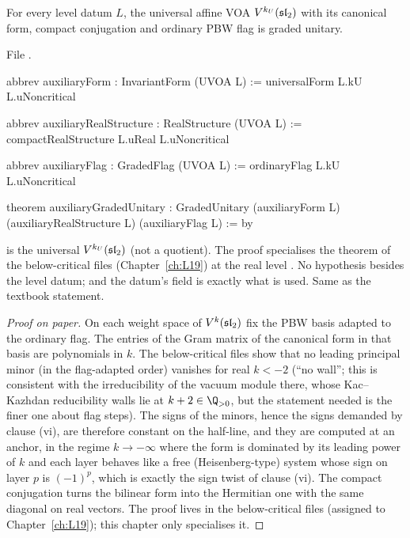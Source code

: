 \begin{theorem}\label{l29:thm:aux}
For every level datum $L$, the universal affine VOA $V^{k_U}(\mathfrak{sl}_2)$ with its canonical form, compact
conjugation and ordinary PBW flag is graded unitary.
\end{theorem}

\noindent File .
\begin{leancode}
abbrev auxiliaryForm : InvariantForm (UVOA L) := universalForm L.kU L.uNoncritical

abbrev auxiliaryRealStructure : RealStructure (UVOA L) :=
  compactRealStructure L.uReal L.uNoncritical

abbrev auxiliaryFlag : GradedFlag (UVOA L) := ordinaryFlag L.kU L.uNoncritical

theorem auxiliaryGradedUnitary :
    GradedUnitary (auxiliaryForm L) (auxiliaryRealStructure L) (auxiliaryFlag L) := by
\end{leancode}

\begin{dictionary}
 is the universal $V^{k_U}(\mathfrak{sl}_2)$ (not a quotient). The proof specialises the theorem
 of the below-critical files (Chapter~\ref{ch:L19}) at the
real level . No hypothesis besides the level datum; and the datum's field  is exactly what
is used. Same as the textbook statement.
\end{dictionary}

\begin{proof}[Proof on paper]
On each weight space of $V^k(\mathfrak{sl}_2)$ fix the PBW basis adapted to the ordinary flag. The entries of the Gram
matrix of the canonical form in that basis are polynomials in $k$. The below-critical files show that no leading
principal minor (in the flag-adapted order) vanishes for real $k<-2$ (``no wall''; this is consistent with the
irreducibility of the vacuum module there, whose Kac--Kazhdan reducibility walls lie at $k+2\in\Q_{>0}$, but the
statement needed is the finer one about flag steps). The signs of the minors, hence the signs demanded by
clause (vi), are therefore constant on the half-line, and they are computed at an anchor, in the regime
$k\to-\infty$ where the form is dominated by its leading power of $k$ and each layer behaves like a free
(Heisenberg-type) system whose sign on layer $p$ is $(-1)^p$, which is exactly the sign twist of clause (vi). The
compact conjugation turns the bilinear form into the Hermitian one with the same diagonal on real vectors. The
proof lives in the below-critical files (assigned to Chapter~\ref{ch:L19}); this chapter only specialises it.
\end{proof}

